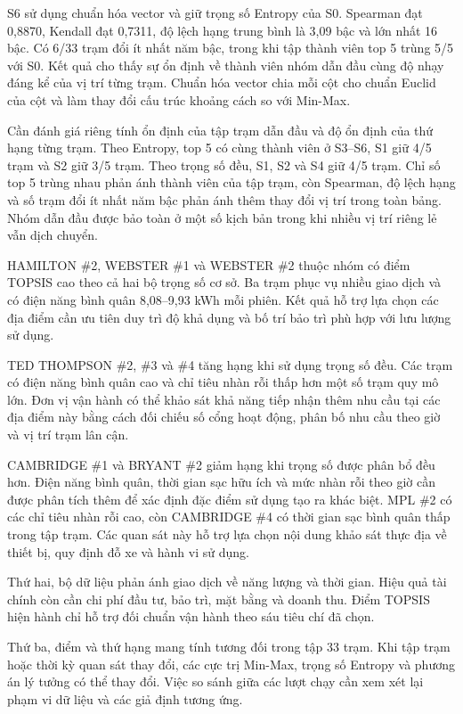 \documentclass[conference,a4paper]{IEEEtran}
\begin{document}
S6 sử dụng chuẩn hóa vector và giữ trọng số Entropy của S0. Spearman đạt 0,8870, Kendall đạt 0,7311, độ lệch hạng trung bình là 3,09 bậc và lớn nhất 16 bậc. Có 6/33 trạm đổi ít nhất năm bậc, trong khi tập thành viên top 5 trùng 5/5 với S0. Kết quả cho thấy sự ổn định về thành viên nhóm dẫn đầu cùng độ nhạy đáng kể của vị trí từng trạm. Chuẩn hóa vector chia mỗi cột cho chuẩn Euclid của cột và làm thay đổi cấu trúc khoảng cách so với Min-Max.

Cần đánh giá riêng tính ổn định của tập trạm dẫn đầu và độ ổn định của thứ hạng từng trạm. Theo Entropy, top 5 có cùng thành viên ở S3–S6, S1 giữ 4/5 trạm và S2 giữ 3/5 trạm. Theo trọng số đều, S1, S2 và S4 giữ 4/5 trạm. Chỉ số top 5 trùng nhau phản ánh thành viên của tập trạm, còn Spearman, độ lệch hạng và số trạm đổi ít nhất năm bậc phản ánh thêm thay đổi vị trí trong toàn bảng. Nhóm dẫn đầu được bảo toàn ở một số kịch bản trong khi nhiều vị trí riêng lẻ vẫn dịch chuyển.

HAMILTON \#2, WEBSTER \#1 và WEBSTER \#2 thuộc nhóm có điểm TOPSIS cao theo cả hai bộ trọng số cơ sở. Ba trạm phục vụ nhiều giao dịch và có điện năng bình quân 8,08–9,93 kWh mỗi phiên. Kết quả hỗ trợ lựa chọn các địa điểm cần ưu tiên duy trì độ khả dụng và bố trí bảo trì phù hợp với lưu lượng sử dụng.

TED THOMPSON \#2, \#3 và \#4 tăng hạng khi sử dụng trọng số đều. Các trạm có điện năng bình quân cao và chỉ tiêu nhàn rỗi thấp hơn một số trạm quy mô lớn. Đơn vị vận hành có thể khảo sát khả năng tiếp nhận thêm nhu cầu tại các địa điểm này bằng cách đối chiếu số cổng hoạt động, phân bố nhu cầu theo giờ và vị trí trạm lân cận.

CAMBRIDGE \#1 và BRYANT \#2 giảm hạng khi trọng số được phân bổ đều hơn. Điện năng bình quân, thời gian sạc hữu ích và mức nhàn rỗi theo giờ cần được phân tích thêm để xác định đặc điểm sử dụng tạo ra khác biệt. MPL \#2 có các chỉ tiêu nhàn rỗi cao, còn CAMBRIDGE \#4 có thời gian sạc bình quân thấp trong tập trạm. Các quan sát này hỗ trợ lựa chọn nội dung khảo sát thực địa về thiết bị, quy định đỗ xe và hành vi sử dụng.

Thứ hai, bộ dữ liệu phản ánh giao dịch về năng lượng và thời gian. Hiệu quả tài chính còn cần chi phí đầu tư, bảo trì, mặt bằng và doanh thu. Điểm TOPSIS hiện hành chỉ hỗ trợ đối chuẩn vận hành theo sáu tiêu chí đã chọn.

Thứ ba, điểm và thứ hạng mang tính tương đối trong tập 33 trạm. Khi tập trạm hoặc thời kỳ quan sát thay đổi, các cực trị Min-Max, trọng số Entropy và phương án lý tưởng có thể thay đổi. Việc so sánh giữa các lượt chạy cần xem xét lại phạm vi dữ liệu và các giả định tương ứng.
\end{document}
